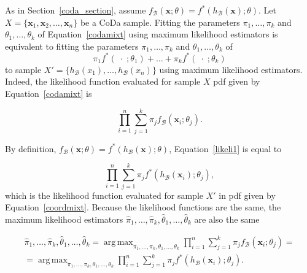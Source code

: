 \documentclass[10pt, a4paper]{article}
\DeclareMathOperator*{\argmax}{arg\,max}
\begin{document}
As in Section~\ref{coda_section}, assume $f_\mathcal{B}(\textbf{x} ; \theta) = f^*(h_\mathcal{B}(\textbf{x}) ; \theta)$. Let $X =  \{ \textbf{x}_1, \textbf{x}_2, \dots , \textbf{x}_n \}$ be a CoDa sample. Fitting the parameters $\pi_1, \dots, \pi_k$ and $\theta_1, \dots, \theta_k$ of Equation~\ref{codamixt} using maximum likelihood estimators is equivalent to fitting the parameters  $\pi_1, \dots, \pi_k$ and $\theta_1, \dots, \theta_k$ of
\begin{equation}
\pi_1 f^*(\;\cdot\; ; \theta_1) + \dots + \pi_k f^*(\;\cdot\; ; \theta_k)
\label{coordmixt}
\end{equation}
to sample $X' = \{ h_\mathcal{B}(x_1), \dots, h_\mathcal{B}(x_n) \}$ using maximum likelihood estimators.
Indeed, the likelihood function evaluated for sample $X$ pdf given by Equation~\ref{codamixt} is

\begin{equation}\label{likeli1}
\prod_{i=1}^n \sum_{j=1}^k \pi_j f_\mathcal{B}(\textbf{x}_i; \theta_j).
\end{equation}

By definition, $f_\mathcal{B}(\textbf{x} ; \theta) = f^*(h_\mathcal{B}(\textbf{x}) ; \theta)$, Equation~\ref{likeli1} is equal to 

\begin{equation}\label{likeli}
\prod_{i=1}^n \sum_{j=1}^k \pi_j f^*(h_\mathcal{B}(\textbf{x}_i); \theta_j),
\end{equation}
which is the likelihood function evaluated for sample $X'$ in pdf given by Equation~\ref{coordmixt}. Because the likelihood functions are the same,  the maximum likelihood estimators $\hat{\pi}_1, \dots, \hat{\pi}_k, \hat{\theta}_1, \dots, \hat{\theta}_k$ are also the same

\begin{eqnarray}
\hat{\pi}_1, \dots, \hat{\pi}_k, \hat{\theta}_1, \dots, \hat{\theta}_k = \argmax_{\pi_1, \dots, \pi_k, \theta_1, \dots, \theta_k} \prod_{i=1}^n \sum_{j=1}^k \pi_j f_\mathcal{B}(\textbf{x}_i; \theta_j) = \\ 
= \argmax_{\pi_1, \dots, \pi_k, \theta_1, \dots, \theta_k} \prod_{i=1}^n \sum_{j=1}^k \pi_j f^*(h_\mathcal{B}(\textbf{x}_i); \theta_j).
\end{eqnarray}
\end{document}
